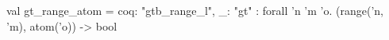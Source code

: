 val gt_range_atom = {coq: "gtb_range_l", _: "gt"}     : forall 'n 'm 'o. (range('n, 'm), atom('o)) -> bool
